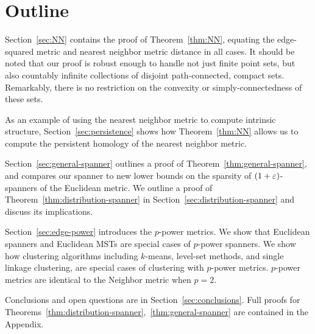 \section{Outline}
%
Section~\ref{sec:NN} contains the proof of Theorem~\ref{thm:NN},
equating the edge-squared metric and nearest neighbor metric distance in
all cases. It should be noted that our proof is robust enough to handle not
just finite point sets, but also countably infinite collections of disjoint
path-connected, compact sets. Remarkably, there is no restriction on the convexity or
simply-connectedness of these sets.

As an example of using the nearest neighbor metric to compute intrinsic structure, Section~\ref{sec:persistence} shows how Theorem~\ref{thm:NN} allows us to compute the persistent homology of the nearest neighbor metric.

Section~\ref{sec:general-spanner} outlines a proof of Theorem~\ref{thm:general-spanner}, and compares our spanner to new lower
bounds
on the sparsity of $(1+\varepsilon)$-spanners of the Euclidean metric.
We outline a proof of Theorem~\ref{thm:distribution-spanner} in
Section~\ref{sec:distribution-spanner} and discuss its implications.

Section~\ref{sec:edge-power} introduces the $p$-power metrics. We show
that Euclidean spanners and Euclidean MSTs are special cases of
$p$-power spanners. We show how
clustering algorithms including $k$-means, level-set methods,
and single linkage clustering, are special cases of
clustering with $p$-power metrics. $p$-power metrics are identical to the
Neighbor metric when $p=2$.


Conclusions and open questions are in
Section~\ref{sec:conclusions}. Full proofs for
Theorems~\ref{thm:distribution-spanner},~\ref{thm:general-spanner}
are contained in the Appendix.
